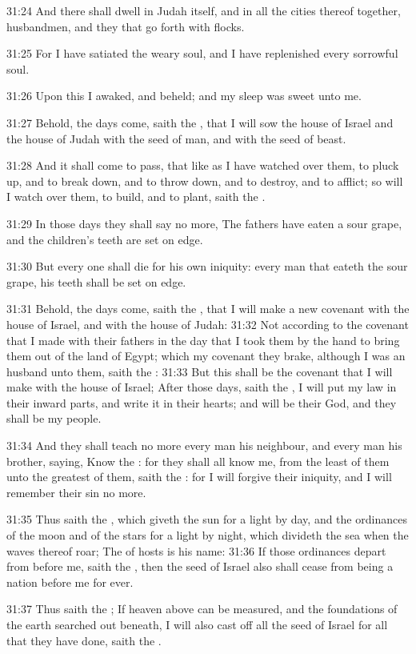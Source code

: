31:24 And there shall dwell in Judah itself, and in all the cities
thereof together, husbandmen, and they that go forth with flocks.

31:25 For I have satiated the weary soul, and I have replenished every
sorrowful soul.

31:26 Upon this I awaked, and beheld; and my sleep was sweet unto me.

31:27 Behold, the days come, saith the \LORD, that I will sow the house
of Israel and the house of Judah with the seed of man, and with the
seed of beast.

31:28 And it shall come to pass, that like as I have watched over
them, to pluck up, and to break down, and to throw down, and to
destroy, and to afflict; so will I watch over them, to build, and to
plant, saith the \LORD.

31:29 In those days they shall say no more, The fathers have eaten a
sour grape, and the children's teeth are set on edge.

31:30 But every one shall die for his own iniquity: every man that
eateth the sour grape, his teeth shall be set on edge.

31:31 Behold, the days come, saith the \LORD, that I will make a new
covenant with the house of Israel, and with the house of Judah: 31:32
Not according to the covenant that I made with their fathers in the
day that I took them by the hand to bring them out of the land of
Egypt; which my covenant they brake, although I was an husband unto
them, saith the \LORD: 31:33 But this shall be the covenant that I will
make with the house of Israel; After those days, saith the \LORD, I
will put my law in their inward parts, and write it in their hearts;
and will be their God, and they shall be my people.

31:34 And they shall teach no more every man his neighbour, and every
man his brother, saying, Know the \LORD: for they shall all know me,
from the least of them unto the greatest of them, saith the \LORD: for
I will forgive their iniquity, and I will remember their sin no more.

31:35 Thus saith the \LORD, which giveth the sun for a light by day,
and the ordinances of the moon and of the stars for a light by night,
which divideth the sea when the waves thereof roar; The \LORD of hosts
is his name: 31:36 If those ordinances depart from before me, saith
the \LORD, then the seed of Israel also shall cease from being a nation
before me for ever.

31:37 Thus saith the \LORD; If heaven above can be measured, and the
foundations of the earth searched out beneath, I will also cast off
all the seed of Israel for all that they have done, saith the \LORD.

